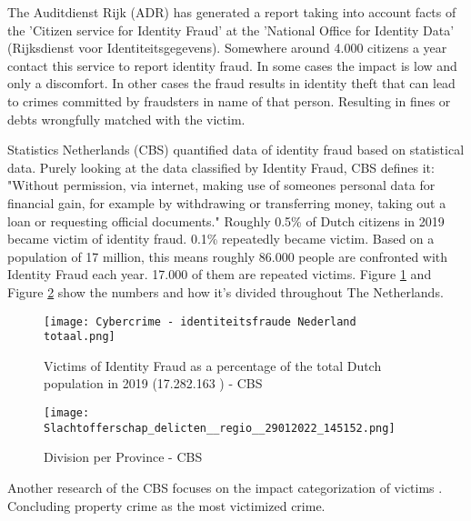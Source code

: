 The Auditdienst Rijk (ADR)\cite{ADR} has generated a report taking into account facts of the 'Citizen service for Identity Fraud' at the 'National Office for Identity Data' (Rijksdienst voor Identiteitsgegevens). Somewhere around 4.000 citizens a year contact this service to report identity fraud. In some cases the impact is low and only a discomfort. In other cases the fraud results in identity theft that can lead to crimes committed by fraudsters in name of that person. Resulting in fines or debts wrongfully matched with the victim.\par 
Statistics Netherlands (CBS) quantified data of identity fraud based on statistical data. Purely looking at the data classified by Identity Fraud, CBS defines it: "Without permission, via internet, making use of someones personal data for financial gain, for example by withdrawing or transferring money, taking out a loan or requesting official documents." Roughly 0.5\% of Dutch citizens in 2019 became victim of identity fraud. 0.1\% repeatedly became victim. Based on a population of 17 million, this means roughly 86.000 people are confronted with Identity Fraud each year. 17.000 of them are repeated victims. Figure \ref{fig:CBS_Total_ID_fraud} and Figure \ref{fig:CBS_ID_fraud} show the numbers and how it's divided throughout The Netherlands.

    
    \begin{figure}
        \graphicspath{ {./images/} }
        \texttt{[image: Cybercrime - identiteitsfraude Nederland totaal.png]}\\
        \caption{Victims of Identity Fraud \cite{CBS_IDFraudTable} as a percentage of the total Dutch population in 2019 (17.282.163 \cite{CBS_totalpopulation2019}) - CBS}  
        \label{fig:CBS_Total_ID_fraud}
    \end{figure}

    
    \begin{figure}
        \graphicspath{ {./images/} }
        \texttt{[image: Slachtofferschap\_delicten\_\_regio\_\_29012022\_145152.png]}\\
        \caption{Division per Province  \cite{CBS_IDFraudTable} - CBS}  
        \label{fig:CBS_ID_fraud}
    \end{figure}

Another research of the CBS focuses on the impact categorization of victims {\cite{CBS_casualtiesDigitalCrime}}. Concluding property crime as the most victimized crime. 

